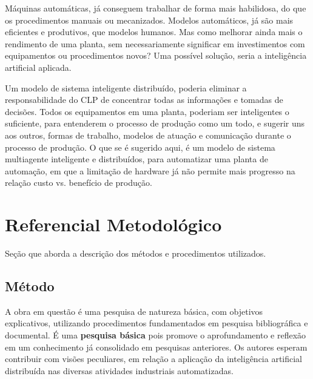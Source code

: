 \documentclass[
	article,			    %
	12pt,				    %
	oneside,			    %
	a4paper,			    %
	chapter=TITLE,		    %
	section=TITLE,		    %
	subsection=TITLE,	    %
	english,			    %
	brazil,				    %
	sumario=tradicional
]{abntex2}
\begin{document}
Máquinas automáticas, já conseguem trabalhar de forma mais habilidosa, do que os procedimentos manuais ou mecanizados. Modelos automáticos, já são mais eficientes e produtivos, que modelos humanos. Mas como melhorar ainda mais o rendimento de uma planta, sem necessariamente significar em investimentos com equipamentos ou procedimentos novos? Uma possível solução, seria a inteligência artificial aplicada. 

Um modelo de sistema inteligente distribuído, poderia eliminar a responsabilidade do CLP de concentrar todas as informações e tomadas de decisões. Todos os equipamentos em uma planta, poderiam ser inteligentes o suficiente, para entenderem o processo de produção como um todo, e sugerir uns aos outros, formas de trabalho, modelos de atuação e comunicação durante o processo de produção. O que se é sugerido aqui, é um modelo de sistema multiagente inteligente e distribuídos, para automatizar uma planta de automação, em que a limitação de hardware já não permite mais progresso na relação custo vs. benefício de produção. 




\section{Referencial Metodológico}
Seção que aborda a descrição dos métodos e procedimentos utilizados.
\subsection{Método}
A obra em questão é uma pesquisa de natureza básica, com objetivos explicativos, utilizando procedimentos fundamentados em pesquisa bibliográfica e documental. É uma \textbf{pesquisa básica} pois promove o aprofundamento e reflexão em um conhecimento já consolidado em pesquisas anteriores. Os autores esperam contribuir com visões peculiares, em relação a aplicação da inteligência artificial distribuída nas diversas atividades industriais automatizadas.
\end{document}
